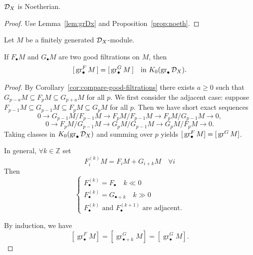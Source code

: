 \begin{corollary}\label{cor:Dx-noeth}
    $\mathcal{D}_X$ is Noetherian.
\end{corollary}
\begin{proof}
    Use Lemma~\ref{lem:grDx} and Proposition~\ref{prop:noeth}.
\end{proof}

Let $M$ be a finitely generated $\mathcal{D}_X$-module.

\begin{lemma}\label{lem:gr-class-independent}
    If $F_\bullet M$ and $G_\bullet M$ are two good filtrations on $M$, then
    \[
        [\,\operatorname{gr}^{F}_\bullet M\,] = [\,\operatorname{gr}^{G}_\bullet M\,] \quad \text{in } K_0(\operatorname{gr}_\bullet\mathcal{D}_X).
    \]
\end{lemma}
\begin{proof}
    By Corollary~\ref{cor:compare-good-filtrations} there exists $a\ge0$ such that
    $G_{p-a}M\subseteq F_pM\subseteq G_{p+a}M$ for all $p$. We first consider the adjacent
    case: suppose $F_{p-1}M\subseteq G_{p-1}M\subseteq F_pM\subseteq G_pM$ for all
    $p$. Then we have short exact sequences
    \[
        0\to G_{p-1}M/F_{p-1}M\to F_pM/F_{p-1}M\to F_pM/G_{p-1}M\to 0,
    \]
    \[
        0\to F_pM/G_{p-1}M\to G_pM/G_{p-1}M\to G_pM/F_pM\to 0.
    \]
    Taking classes in $K_0(\operatorname{gr}_\bullet \mathcal{D}_X)$ and summing over $p$ yields
    $[\,\operatorname{gr}^{F}_\bullet M]=[\,\operatorname{gr}^{G}M]$.

    \noindent In general, $\forall k \in \mathbb Z$ set
    \[
        F^{(k)}_i M = F_i M + G_{i+k} M \quad \forall i
    \]
    Then
    \[
        \begin{cases}
            F^{(k)}_\bullet = F_\bullet \quad k \ll 0       \\
            F^{(k)}_\bullet = G_{\bullet + k} \quad k \gg 0 \\
            F^{(k)}_\bullet \text{ and } F^{(k+1)}_\bullet \text{ are adjacent}.
        \end{cases}
    \]

    \vspace{1em} %

    \noindent By induction, we have
    \[
        [\operatorname{gr}^F_\bullet M] = [\operatorname{gr}^G_{\bullet+k} M] = [\operatorname{gr}^G_\bullet M].
    \]
\end{proof}

